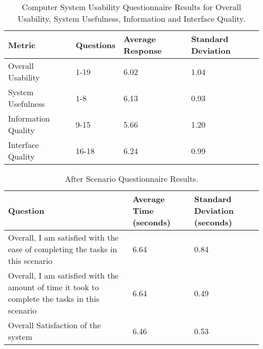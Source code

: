 \documentclass[twocolumn]{bmcart}%
\begin{document}
\begin{backmatter}
\begin{table}[h!]
\caption{Computer System Usability Questionnaire Results for Overall Usability, System Usefulness, Information and Interface Quality.}
      \begin{tabular}{L{2.5cm}lR{1.2cm}R{1.2cm}}
      \hline
      Metric & Questions & Average Response & Standard Deviation \\ \hline
      Overall Usability   &  1-19 & 6.02 & 1.04 \\ 
      System Usefulness   &  1-8  & 6.13 & 0.93 \\ 
      Information Quality &  9-15 & 5.66 & 1.20 \\ 
      Interface Quality   & 16-18 & 6.24 & 0.99 \\ \hline
      \end{tabular}
\label{tbl:CSUQOverallUsabilityResults}
\end{table}

\begin{table}[h!]
\caption{After Scenario Questionnaire Results.}
      \begin{tabular}{L{3.85cm}R{1.2cm}R{1.2cm}}
      \hline
      Question & Average Time (seconds) & Standard Deviation (seconds)\\ \hline
      Overall, I am satisfied with the ease of completing the tasks in this scenario & 6.64 & 0.84 \\
      Overall, I am satisfied with the amount of time it took to complete the tasks in this scenario & 6.64 & 0.49 \\
      Overall Satisfaction of the system & 6.46 & 0.53 \\ \hline
      \end{tabular}
\label{tbl:ASQResults}
\end{table}



%


\end{backmatter}
\end{document}
